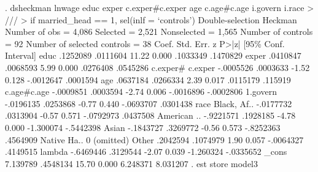 . dsheckman lnwage educ exper c.exper\#c.exper age c.age\#c.age i.govern  i.race 
> ///
>         if married_head == 1, sel(inlf = `controls')                    
{\smallskip}
Double-selection Heckman              Number of obs               =      4,086
                                      Selected                    =      2,521
                                      Nonselected                 =      1,565
                                      Number of controls          =         92
                                      Number of selected controls =         38
{\smallskip}
             {\VBAR}      Coef.   Std. Err.      z    P>|z|     [95\% Conf. Interval]
        educ {\VBAR}   .1252089   .0111604    11.22   0.000     .1033349    .1470829
       exper {\VBAR}   .0410847   .0068593     5.99   0.000     .0276408    .0545286
             {\VBAR}
     c.exper\#{\VBAR}
     c.exper {\VBAR}  -.0005526   .0003633    -1.52   0.128    -.0012647    .0001594
             {\VBAR}
         age {\VBAR}   .0637184   .0266334     2.39   0.017     .0115179     .115919
             {\VBAR}
 c.age\#c.age {\VBAR}  -.0009851   .0003594    -2.74   0.006    -.0016896   -.0002806
             {\VBAR}
    1.govern {\VBAR}  -.0196135   .0253868    -0.77   0.440    -.0693707    .0301438
             {\VBAR}
        race {\VBAR}
Black, Af..  {\VBAR}  -.0177732   .0313904    -0.57   0.571    -.0792973    .0437508
American ..  {\VBAR}  -.9221571   .1928185    -4.78   0.000    -1.300074   -.5442398
      Asian  {\VBAR}  -.1843727   .3269772    -0.56   0.573    -.8252363    .4564909
Native Ha..  {\VBAR}          0  (omitted)
      Other  {\VBAR}   .2042594   .1074979     1.90   0.057    -.0064327    .4149515
             {\VBAR}
      lambda {\VBAR}  -.6469446   .3129544    -2.07   0.039    -1.260324   -.0335652
       _cons {\VBAR}   7.139789   .4548134    15.70   0.000     6.248371    8.031207
{\smallskip}
. est store model3
{\smallskip}
